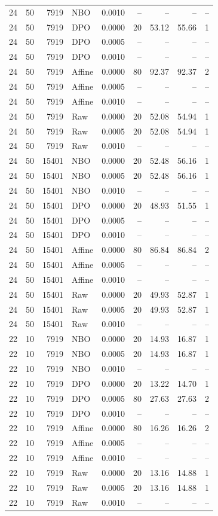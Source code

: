 \begin{longtable}{lrrlrrrrr}
24 & 50 & 7919 & NBO & 0.0010 & -- & -- & -- & --\\
24 & 50 & 7919 & DPO & 0.0000 & 20 & 53.12 & 55.66 & 1\\
24 & 50 & 7919 & DPO & 0.0005 & -- & -- & -- & --\\
24 & 50 & 7919 & DPO & 0.0010 & -- & -- & -- & --\\
24 & 50 & 7919 & Affine & 0.0000 & 80 & 92.37 & 92.37 & 2\\
24 & 50 & 7919 & Affine & 0.0005 & -- & -- & -- & --\\
24 & 50 & 7919 & Affine & 0.0010 & -- & -- & -- & --\\
24 & 50 & 7919 & Raw & 0.0000 & 20 & 52.08 & 54.94 & 1\\
24 & 50 & 7919 & Raw & 0.0005 & 20 & 52.08 & 54.94 & 1\\
24 & 50 & 7919 & Raw & 0.0010 & -- & -- & -- & --\\
24 & 50 & 15401 & NBO & 0.0000 & 20 & 52.48 & 56.16 & 1\\
24 & 50 & 15401 & NBO & 0.0005 & 20 & 52.48 & 56.16 & 1\\
24 & 50 & 15401 & NBO & 0.0010 & -- & -- & -- & --\\
24 & 50 & 15401 & DPO & 0.0000 & 20 & 48.93 & 51.55 & 1\\
24 & 50 & 15401 & DPO & 0.0005 & -- & -- & -- & --\\
24 & 50 & 15401 & DPO & 0.0010 & -- & -- & -- & --\\
24 & 50 & 15401 & Affine & 0.0000 & 80 & 86.84 & 86.84 & 2\\
24 & 50 & 15401 & Affine & 0.0005 & -- & -- & -- & --\\
24 & 50 & 15401 & Affine & 0.0010 & -- & -- & -- & --\\
24 & 50 & 15401 & Raw & 0.0000 & 20 & 49.93 & 52.87 & 1\\
24 & 50 & 15401 & Raw & 0.0005 & 20 & 49.93 & 52.87 & 1\\
24 & 50 & 15401 & Raw & 0.0010 & -- & -- & -- & --\\
22 & 10 & 7919 & NBO & 0.0000 & 20 & 14.93 & 16.87 & 1\\
22 & 10 & 7919 & NBO & 0.0005 & 20 & 14.93 & 16.87 & 1\\
22 & 10 & 7919 & NBO & 0.0010 & -- & -- & -- & --\\
22 & 10 & 7919 & DPO & 0.0000 & 20 & 13.22 & 14.70 & 1\\
22 & 10 & 7919 & DPO & 0.0005 & 80 & 27.63 & 27.63 & 2\\
22 & 10 & 7919 & DPO & 0.0010 & -- & -- & -- & --\\
22 & 10 & 7919 & Affine & 0.0000 & 80 & 16.26 & 16.26 & 2\\
22 & 10 & 7919 & Affine & 0.0005 & -- & -- & -- & --\\
22 & 10 & 7919 & Affine & 0.0010 & -- & -- & -- & --\\
22 & 10 & 7919 & Raw & 0.0000 & 20 & 13.16 & 14.88 & 1\\
22 & 10 & 7919 & Raw & 0.0005 & 20 & 13.16 & 14.88 & 1\\
22 & 10 & 7919 & Raw & 0.0010 & -- & -- & -- & --\\
\bottomrule\end{longtable}
